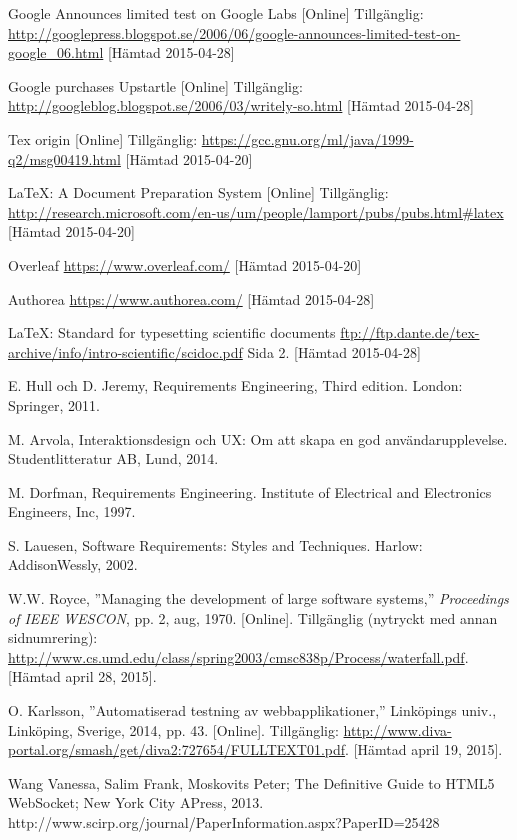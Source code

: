 \begin{thebibliography}{9}
Google Announces limited test on Google Labs [Online] Tillgänglig: 
\url{http://googlepress.blogspot.se/2006/06/google-announces-limited-test-on-google_06.html} [Hämtad 2015-04-28]

Google purchases Upstartle [Online] Tillgänglig: 
\url{http://googleblog.blogspot.se/2006/03/writely-so.html} [Hämtad 2015-04-28]

Tex origin [Online] Tillgänglig: 
\url{https://gcc.gnu.org/ml/java/1999-q2/msg00419.html} [Hämtad 2015-04-20]

LaTeX: A Document Preparation System [Online] Tillgänglig: 
\url{http://research.microsoft.com/en-us/um/people/lamport/pubs/pubs.html#latex} [Hämtad 2015-04-20]

Overleaf 
\url{https://www.overleaf.com/} [Hämtad 2015-04-20]

Authorea 
\url{https://www.authorea.com/} [Hämtad 2015-04-28]
 
LaTeX: Standard for typesetting scientific documents
\url{ftp://ftp.dante.de/tex-archive/info/intro-scientific/scidoc.pdf} Sida 2. [Hämtad 2015-04-28]


E. Hull och D. Jeremy, Requirements Engineering, Third edition. London: Springer, 2011.

M. Arvola, Interaktionsdesign och UX: Om att skapa en god användarupplevelse. Studentlitteratur AB, Lund, 2014.

M. Dorfman, Requirements Engineering. Institute of Electrical and Electronics Engineers, Inc, 1997.

S. Lauesen, Software Requirements: Styles and Techniques. Harlow: AddisonWessly, 2002.


W.W. Royce, ''Managing the development of large software systems,''
\textit{Proceedings of IEEE WESCON}, pp. 2, aug, 1970.
[Online].
Tillgänglig (nytryckt med annan sidnumrering):
\url{http://www.cs.umd.edu/class/spring2003/cmsc838p/Process/waterfall.pdf}.
[Hämtad april 28, 2015].

O. Karlsson, ''Automatiserad testning av webbapplikationer,''
Linköpings univ., Linköping, Sverige, 2014, pp. 43.
[Online]. 
Tillgänglig: 
\url{http://www.diva-portal.org/smash/get/diva2:727654/FULLTEXT01.pdf}.
[Hämtad april 19, 2015].

 Wang Vanessa, Salim Frank, Moskovits Peter; The Definitive Guide to HTML5 WebSocket; New York City APress, 2013.
 http://www.scirp.org/journal/PaperInformation.aspx?PaperID=25428


\end{thebibliography}
